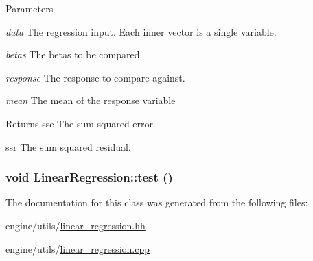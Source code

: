 \begin{DoxyParams}{Parameters}
\item[{\em data}]The regression input. Each inner vector is a single variable. \item[{\em betas}]The betas to be compared. \item[{\em response}]The response to compare against. \item[{\em mean}]The mean of the response variable \end{DoxyParams}
\begin{DoxyReturn}{Returns}
sse The sum squared error 

ssr The sum squared residual. 
\end{DoxyReturn}
\hypertarget{classLinearRegression_a866934791e5415bf573a9030650ef8cb}{
\subsubsection[{test}]{\setlength{\rightskip}{0pt plus 5cm}void LinearRegression::test ()}}
\label{classLinearRegression_a866934791e5415bf573a9030650ef8cb}


The documentation for this class was generated from the following files:\begin{DoxyCompactItemize}
\item 
engine/utils/\hyperlink{linear__regression_8hh}{linear\_\-regression.hh}\item 
engine/utils/\hyperlink{linear__regression_8cpp}{linear\_\-regression.cpp}\end{DoxyCompactItemize}
